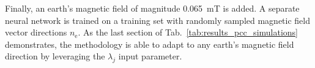 Finally, an earth's magnetic field of magnitude \SI{0.065}{mT} is added. A separate neural network is trained on a training set with randomly sampled magnetic field vector directions $n_\mathrm{e}$. As the last section of Tab.~\ref{tab:results_pcc_simulations} demonstrates, the methodology is able to adapt to any earth's magnetic field direction by leveraging the $\lambda_j$ input parameter.


